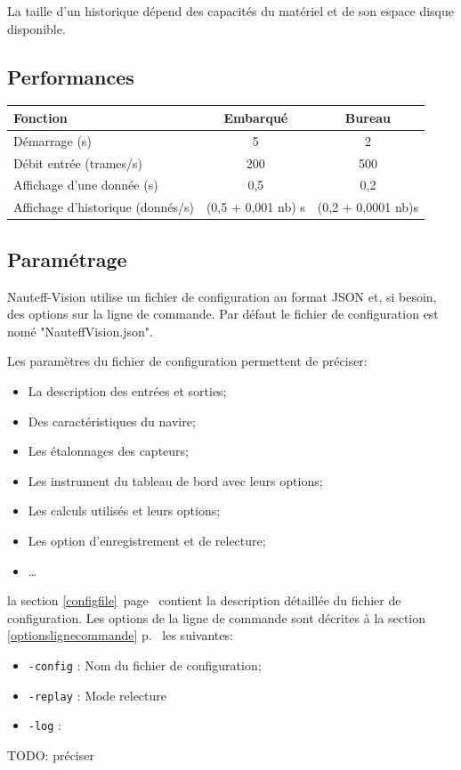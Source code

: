 \documentclass[a4paper,11pt]{report}
\newcommand{\myref}[1]{\ref{#1} p.\ \pageref{#1}}
\begin{document}
La taille d'un historique dépend des capacités du matériel et de son espace disque disponible.


\subsection{Performances}

\begin{tabular}{|l|c|c|}
	\hline
	Fonction & Embarqué &  Bureau\\
	\hline
	Démarrage (s) & 5 & 2 \\
	\hline
	Débit entrée (trames/s) & 200  &  500 \\
	\hline
    Affichage d'une donnée (s) & 0,5 &  0,2\\
	\hline
	Affichage d'historique (donnés/s)& (0,5 + 0,001 nb) s &  (0,2 + 0,0001 nb)s\\
	\hline
\end{tabular}

\subsection{Paramétrage}

Nauteff-Vision utilise un fichier de configuration au format JSON et,
si besoin, des options sur la ligne de commande.
Par défaut le fichier de configuration est nomé "NauteffVision.json". 

Les paramètres du fichier de configuration permettent de préciser:
\begin{itemize}
    \item La description des entrées et sorties;
    \item Des caractéristiques du navire;
    \item Les étalonnages des capteurs;
    \item Les instrument du tableau de bord avec leurs options;
    \item Les calculs utilisés et leurs options;
    \item Les option d'enregistrement et de relecture;
    \item \dots
\end{itemize}
la section \ref{configfile}\ page\ \pageref{configfile} contient la description détaillée
du fichier de configuration.
Les options de la ligne de commande sont décrites à la section \myref{optionslignecommande}
les suivantes:
\begin{itemize}
  \item[] \texttt{-config} : Nom du fichier de configuration;
  \item[] \texttt{-replay} : Mode relecture
  \item[] \texttt{-log} : 
\end{itemize}
TODO: préciser
\end{document}
